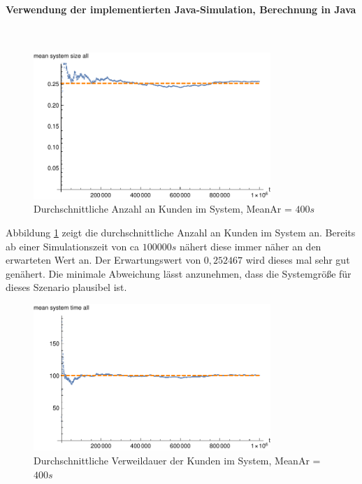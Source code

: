 \paragraph{Verwendung der implementierten Java-Simulation, Berechnung in Java}
\label{JavaTwoPhones400}
\\
\begin{figure}[htpb]
	\centering
	\includegraphics[width=0.8\textwidth]{abbildungen/2_Phone_VIP/Arrival_400_Serve_100_dur_1000000_Skip_0/MeanSystemSizeAll.pdf}
	\caption{Durchschnittliche Anzahl an Kunden im System, MeanAr = $400s$}
	\label{fig:mean3SystemSize400}
\end{figure}

Abbildung \ref{fig:mean3SystemSize400} zeigt die durchschnittliche Anzahl an Kunden im System an. Bereits ab einer Simulationszeit von ca $100000s$ nähert diese immer näher an den erwarteten Wert an. Der Erwartungswert von $0,252467$ wird dieses mal sehr gut genähert. Die minimale Abweichung lässt anzunehmen, dass die Systemgröße für dieses Szenario plausibel ist.

\begin{figure}[htpb]
	\centering
	\includegraphics[width=0.8\textwidth]{abbildungen/2_Phone_VIP/Arrival_400_Serve_100_dur_1000000_Skip_0/MeanSystemTimeAll.pdf}
	\caption{Durchschnittliche Verweildauer der Kunden im System, MeanAr = $400s$}
	\label{fig:mean3SystemTime400}
\end{figure}

